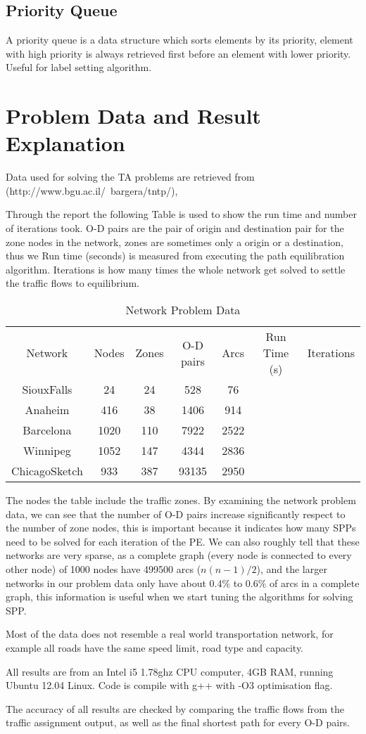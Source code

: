 \subsection{Priority Queue}
A priority queue is a data structure which sorts elements by its priority,
element with high priority is always retrieved first before an element with lower priority.
Useful for label setting algorithm.

\section{Problem Data and Result Explanation}
Data used for solving the TA problems are retrieved from (http://www.bgu.ac.il/~bargera/tntp/),

Through the report the following Table is used to show the 
run time and number of iterations took.
O-D pairs are the pair of origin and destination pair for the zone nodes in the network,
zones are sometimes only a origin or a destination,
thus we 
Run time (seconds) is measured from executing the 
path equilibration algorithm.
Iterations is how many times the whole network
get solved to settle the traffic flows to equilibrium.
\begin{table}[H]
    \centering
    \begin{tabular}{ccccccc}
        Network & Nodes & Zones & O-D pairs & Arcs & Run Time (s) & Iterations \\
        SiouxFalls    & 24   & 24  & 528   & 76   \\
        Anaheim       & 416  & 38  & 1406  & 914  \\
        Barcelona     & 1020 & 110 & 7922  & 2522 \\
        Winnipeg      & 1052 & 147 & 4344  & 2836 \\
        ChicagoSketch & 933  & 387 & 93135 & 2950 
    \end{tabular}
    \caption{Network Problem Data}
\end{table}
The nodes the table include the traffic zones.
By examining the network problem data,
we can see that the number of O-D pairs increase
significantly respect to the number of zone nodes,
this is important because it indicates how many SPPs need to be solved for each iteration of the PE.
We can also roughly tell that these networks are very sparse,
as a complete graph (every node is connected to every other node) of 1000 nodes have 499500 arcs ($n(n-1)/2$),
and the larger networks in our problem data only have about 0.4\% to 0.6\% of arcs in a complete graph, this information is useful
when we start tuning the algorithms for solving SPP.

Most of the data does not resemble a real world transportation network, 
for example all roads have the same speed limit, road type and capacity.

All results are from an Intel i5 1.78ghz CPU computer, 4GB RAM, running Ubuntu 12.04 Linux.
Code is compile with g++ with -O3 optimisation flag.

The accuracy of all results are checked by comparing the traffic flows from the traffic assignment output,
as well as the final shortest path for every O-D pairs.

